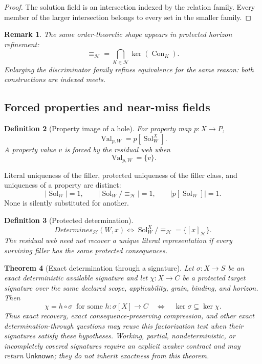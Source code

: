\documentclass[11pt,oneside]{article}
\newtheorem{definition}{Definition}[section]
\newtheorem{theorem}[definition]{Theorem}
\newtheorem{remark}[definition]{Remark}
\newcommand{\Con}{\operatorname{Con}}
\begin{document}
\begin{proof}
The solution field is an intersection indexed by the relation family.  Every member of the larger intersection belongs to every set in the smaller family.
\end{proof}

\begin{remark}
The same order-theoretic shape appears in protected horizon refinement:
\[
\equiv_{\mathcal H}
=
\bigcap_{K\in\mathcal H}\ker(\Con_K).
\]
Enlarging the discriminator family refines equivalence for the same reason: both constructions are indexed meets.
\end{remark}

\subsection{Forced properties and near-miss fields}

\begin{definition}[Property image of a hole]
For property map \(p:X\to P\),
\[
\boxed{
\operatorname{Val}_{p,W}
=
p[\operatorname{Sol}^{X}_{W}].
}
\]
A property value \(v\) is forced by the residual web when
\[
\boxed{
\operatorname{Val}_{p,W}=\{v\}.
}
\]
\end{definition}

Literal uniqueness of the filler, protected uniqueness of the filler class, and uniqueness of a property are distinct:
\[
|\operatorname{Sol}_W|=1,
\qquad
|\operatorname{Sol}_W/{\equiv_{\mathcal H}}|=1,
\qquad
|p[\operatorname{Sol}_W]|=1.
\]
None is silently substituted for another.

\begin{definition}[Protected determination]
\[
\boxed{
Determines_{\mathcal H}(W,x)
\iff
\operatorname{Sol}^{X}_{W}/{\equiv_{\mathcal H}}
=
\{[x]_{\mathcal H}\}.
}
\]
The residual web need not recover a unique literal representation if every surviving filler has the same protected consequences.
\end{definition}

\begin{theorem}[Exact determination through a signature]\label{thm:determine-through}
Let \(\sigma:X\to S\) be an exact deterministic available signature and let
\(\chi:X\to C\) be a protected target signature over the same declared scope,
applicability, grain, binding, and horizon.  Then
\[
\boxed{
\chi=h\circ\sigma\ \text{ for some }h:\sigma[X]\to C
\quad\Longleftrightarrow\quad
\ker\sigma\subseteq\ker\chi.
}
\]
Thus exact recovery, exact consequence-preserving compression, and other exact
determination-through questions may reuse this factorization test when their
signatures satisfy these hypotheses.  Working, partial, nondeterministic, or
incompletely covered signatures require an explicit weaker contract and may return
\(\mathsf{Unknown}\); they do not inherit exactness from this theorem.
\end{theorem}
\end{document}
